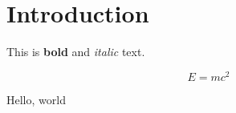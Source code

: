 \documentclass{article}
\newcommand{\hello}[1]{Hello, #1}
\begin{document}
\section{Introduction}
This is \textbf{bold} and \emph{italic} text.

\begin{equation}
  E = mc^2
\end{equation}

\hello{world}
\end{document}
